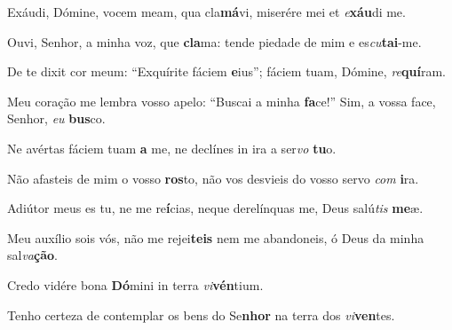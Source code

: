 \begin{greenumerate}

  \item Exáudi, Dómine, vocem meam, qua cla\textbf{má}vi, {\GreStar} miserére mei et \textit{e}\textbf{xáu}di me. 

  \switchcolumn%

  \item Ouvi, Senhor, a minha voz, que \textbf{cla}ma: {\GreStar} tende piedade de mim e es\textit{cu}\textbf{tai}-me. 

  \switchcolumn*


  \item De te dixit cor meum: ``Exquírite fáciem \textbf{e}ius''; {\GreStar} fáciem tuam, Dómine, \textit{re}\textbf{quí}ram. 

  \switchcolumn%

  \item Meu coração me lembra vosso apelo: ``Buscai a minha \textbf{fa}ce!'' {\GreStar} Sim, a vossa face, Senhor, \textit{eu} \textbf{bus}co. 

  \switchcolumn*


  \item Ne avértas fáciem tuam \textbf{a} me, {\GreStar} ne declínes in ira a ser\textit{vo} \textbf{tu}o. 

  \switchcolumn%

  \item Não afasteis de mim o vosso \textbf{ros}to, {\GreStar} não vos desvieis do vosso servo \textit{com} \textbf{i}ra. 

  \switchcolumn*


  \item Adiútor meus es tu, ne me re\textbf{í}cias, {\GreStar} neque derelínquas me, Deus salú\textit{tis} \textbf{me}æ. 

  \switchcolumn%

  \item Meu auxílio sois vós, não me rejei\textbf{teis} {\GreStar} nem me abandoneis, ó Deus da minha sal\textit{va}\textbf{ção}. 

  \switchcolumn*


  \item Credo vidére bona \textbf{Dó}mini {\GreStar} in terra \textit{vi}\textbf{vén}tium. 

  \switchcolumn%

  \item Tenho certeza de contemplar os bens do Se\textbf{nhor} {\GreStar} na terra dos \textit{vi}\textbf{ven}tes. 
\end{greenumerate}